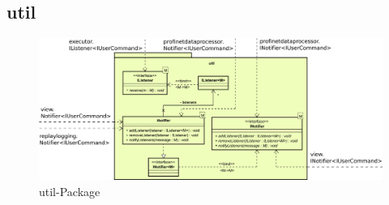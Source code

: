\subsection{util}
\label{subsec:util}

\begin{figure}[H]
  \centering
  \includegraphics[width=\textwidth]{../diagramimages/util.png}
  \caption{util-Package}
\end{figure}

